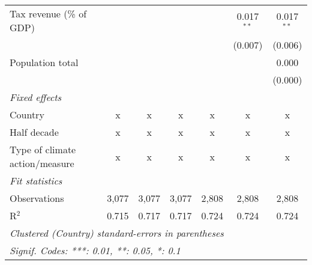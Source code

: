 \begin{tabular}{lcccccc}
   Tax revenue (\% of GDP)                                           &         &                &                &                & 0.017$^{**}$   & 0.017$^{**}$\\   
                                                                     &         &                &                &                & (0.007)        & (0.006)\\   
   Population total                                                  &         &                &                &                &                & 0.000\\   
                                                                     &         &                &                &                &                & (0.000)\\   
   \emph{Fixed effects}\\
   Country                                                           & x       & x              & x              & x              & x              & x\\  
   Half decade                                                       & x       & x              & x              & x              & x              & x\\  
   Type of climate action/measure                                    & x       & x              & x              & x              & x              & x\\  
   \midrule \emph{Fit statistics}\\
   Observations                                                      & 3,077   & 3,077          & 3,077          & 2,808          & 2,808          & 2,808\\  
   R$^2$                                                             & 0.715   & 0.717          & 0.717          & 0.724          & 0.724          & 0.724\\  
   \midrule
   \multicolumn{7}{l}{\emph{Clustered (Country) standard-errors in parentheses}}\\
   \multicolumn{7}{l}{\emph{Signif. Codes: ***: 0.01, **: 0.05, *: 0.1}}\\
\end{tabular}
\par\endgroup


